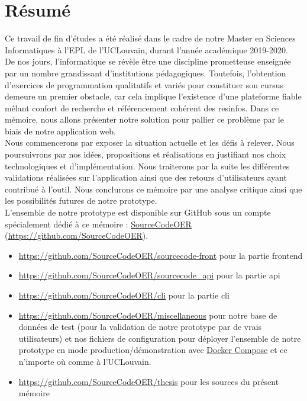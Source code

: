 \chapter*{Résumé}

Ce travail de fin d'études a été réalisé dans le cadre de notre Master en Sciences Informatiques à l'EPL de l'UCLouvain, durant l'année académique 2019-2020.\\

De nos jours, l'informatique se révèle être une discipline prometteuse enseignée par un nombre grandissant d'institutions pédagogiques. Toutefois, l'obtention d'exercices de programmation qualitatifs et variés pour constituer son cursus demeure un premier obstacle, car cela implique l'existence d'une plateforme fiable mêlant confort de recherche et référencement cohérent des \glspl{resinfo}. 
Dans ce mémoire, nous allons présenter notre solution pour pallier ce problème par le biais de notre application web.\\

Nous commencerons par exposer la situation actuelle et les défis à relever. Nous poursuivrons par nos idées, propositions et réalisations en justifiant nos choix technologiques et d'implémentation. Nous traiterons par la suite les différentes validations réalisées sur l'application ainsi que des retours d'utilisateurs ayant contribué à l'outil. Nous conclurons ce mémoire par une analyse critique ainsi que les possibilités futures de notre prototype. \\

L'ensemble de notre prototype est disponible sur GitHub sous un compte spécialement dédié à ce mémoire : 
\href{https://github.com/SourceCodeOER}{SourceCodeOER} (\href{https://github.com/SourceCodeOER}{https://github.com/SourceCodeOER}).

\begin{itemize}
    \item \href{https://github.com/SourceCodeOER/sourcecode-front}{https://github.com/SourceCodeOER/sourcecode-front} pour la partie \gls{frontend}
    \item \href{https://github.com/SourceCodeOER/sourcecode\_api}{https://github.com/SourceCodeOER/sourcecode\_api} pour la partie \Gls{api}
    \item \href{https://github.com/SourceCodeOER/cli}{https://github.com/SourceCodeOER/cli} pour la partie \Gls{cli}
    \item \href{https://github.com/SourceCodeOER/miscellaneous}{https://github.com/SourceCodeOER/miscellaneous} pour notre base de données de test (pour la validation de notre prototype par de vrais utilisateurs) et nos fichiers de configuration pour déployer l'ensemble de notre prototype en mode production/démonstration avec \href{https://docs.docker.com/compose/}{Docker Compose} et ce n'importe où comme à l'UCLouvain.
    \item \href{https://github.com/SourceCodeOER/thesis}{https://github.com/SourceCodeOER/thesis} pour les sources du présent mémoire
\end{itemize}

